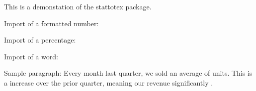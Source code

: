 \documentclass{article}
\begin{document}
    This is a demonstation of the stattotex package.

    Import of a formatted number: \FormatTest

    Import of a percentage: \PctTest

    Import of a word: \WordTest

    Sample paragraph: Every month last quarter, we sold an average of \FormatTest \space units. This is a \PctTest \space increase over the prior quarter, meaning our revenue significantly \WordTest.
\end{document}

